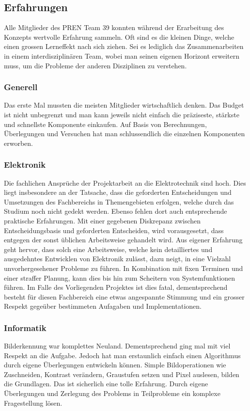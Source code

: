 \subsection{Erfahrungen}
Alle Mitglieder des PREN Team 39 konnten während der Erarbeitung des Konzepts
wertvolle Erfahrung sammeln. Oft sind es die kleinen Dinge, welche einen
grossen Lerneffekt nach sich ziehen. Sei es lediglich das Zusammenarbeiten
in einem interdisziplinären Team, wobei man seinen eigenen Horizont erweitern
muss, um die Probleme der anderen Disziplinen zu verstehen.

\subsubsection*{Generell}
Das erste Mal mussten die meisten Mitglieder wirtschaftlich denken. Das
Budget ist nicht unbegrenzt und man kann jeweils nicht einfach die präziseste,
stärkste und schnellste Komponente einkaufen. Auf Basis von Berechnungen,
Überlegungen und Versuchen hat man schlussendlich die einzelnen Komponenten
erworben.

\subsubsection*{Elektronik}
Die fachlichen Ansprüche der Projektarbeit an die Elektrotechnik sind hoch.
Dies liegt insbesondere an der Tatsache, dass die geforderten Entscheidungen
und Umsetzungen des Fachbereichs in Themengebieten erfolgen, welche durch
das Studium noch nicht gedekt werden. Ebenso fehlen dort auch entsprechende
praktische Erfahrungen. Mit einer gegebenen Diskrepanz zwischen
Entscheidungsbasis und geforderten Entscheiden, wird vorausgesetzt, dass
entgegen der sonst üblichen Arbeitsweise gehandelt wird. Aus eigener
Erfahrung geht hervor, dass solch eine Arbeitsweise, welche kein
detailliertes und ausgedehntes Entwicklen von Elektronik zulässt, dazu neigt,
in eine Vielzahl unvorhergesehener Probleme zu führen. In Kombination mit
fixen Terminen und einer straffer Planung, kann dies bis hin zum Scheitern
von Systemfunktionen führen. Im Falle des Vorliegenden Projektes ist dies
fatal, dementsprechend besteht für diesen Fachbereich eine etwas angespannte
Stimmung und ein grosser Respekt gegeüber bestimmeten Aufagaben und
Implementationen.

\subsubsection*{Informatik}
Bilderkennung war komplettes Neuland. Dementsprechend ging mal mit viel
Respekt an die Aufgabe. Jedoch hat man erstaunlich einfach einen Algorithmus
durch eigene Überlegungen entwickeln können. Simple Bildoperationen wie
Zuschneiden, Kontrast verändern, Graustufen setzen und Pixel auslesen, bilden
die Grundlagen. Das ist sicherlich eine tolle Erfahrung. Durch eigene
Überlegungen und Zerlegung des Problems in Teilprobleme ein komplexe
Fragestellung lösen.

